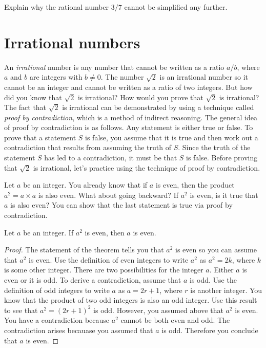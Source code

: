 \documentclass[a4paper,oneside,12pt]{article}
\begin{document}
\begin{exercise}
Explain why the rational number $3/7$ cannot be simplified any
further.
\end{exercise}




\section{Irrational numbers}

An \emph{irrational} number is any number that cannot be written as a
ratio $a / b$, where $a$ and $b$ are integers with $b \neq 0$.  The
number $\sqrt{2}$ is an irrational number so it cannot be an integer
and cannot be written as a ratio of two integers.  But how did you
know that $\sqrt{2}$ is irrational?  How would you prove that
$\sqrt{2}$ is irrational?  The fact that $\sqrt{2}$ is irrational can
be demonstrated by using a technique called
\emph{proof by contradiction}, which is a method of indirect
reasoning.  The general idea of proof by contradiction is as follows.
Any statement is either true or false.  To prove that a statement $S$
is false, you assume that it is true and then work out a contradiction
that results from assuming the truth of $S$.  Since the truth of the
statement $S$ has led to a contradiction, it must be that $S$ is
false.  Before proving that $\sqrt{2}$ is irrational, let's practice
using the technique of proof by contradiction.

Let $a$ be an integer.  You already know that if $a$ is even, then the
product $a^2 = a \times a$ is also even.  What about going backward?
If $a^2$ is even, is it true that $a$ is also even?  You can show that
the last statement is true via proof by contradiction.

\begin{theorem}
\label{thm:a_squared_even_implies_a_even}
Let $a$ be an integer.  If $a^2$ is even, then $a$ is even.
\end{theorem}

\begin{proof}
The statement of the theorem tells you that $a^2$ is even so you can
assume that $a^2$ is even.  Use the definition of even integers to
write $a^2$ as $a^2 = 2k$, where $k$ is some other integer.  There are
two possibilities for the integer $a$.  Either $a$ is even or it is
odd.  To derive a contradiction, assume that $a$ is odd.  Use the
definition of odd integers to write $a$ as $a = 2r + 1$, where $r$ is
another integer.  You know that the product of two odd integers is
also an odd integer.  Use this result to see that $a^2 = (2r + 1)^2$
is odd.  However, you assumed above that $a^2$ is even.  You have a
contradiction because $a^2$ cannot be both even and odd.  The
contradiction arises becauase you assumed that $a$ is odd.  Therefore
you conclude that $a$ is even.
\end{proof}
\end{document}
